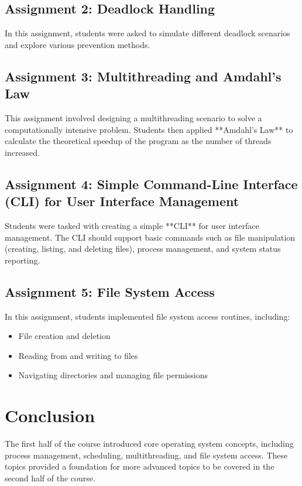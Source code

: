 \documentclass[12pt]{article}
\begin{document}
\subsection{Assignment 2: Deadlock Handling}
In this assignment, students were asked to simulate different deadlock scenarios and explore various prevention methods.

\subsection{Assignment 3: Multithreading and Amdahl's Law}
This assignment involved designing a multithreading scenario to solve a computationally intensive problem. Students then applied **Amdahl's Law** to calculate the theoretical speedup of the program as the number of threads increased.

\subsection{Assignment 4: Simple Command-Line Interface (CLI) for User Interface Management}
Students were tasked with creating a simple **CLI** for user interface management. The CLI should support basic commands such as file manipulation (creating, listing, and deleting files), process management, and system status reporting.

\subsection{Assignment 5: File System Access}
In this assignment, students implemented file system access routines, including:
\begin{itemize}
    \item File creation and deletion
    \item Reading from and writing to files
    \item Navigating directories and managing file permissions
\end{itemize}

\section{Conclusion}
The first half of the course introduced core operating system concepts, including process management, scheduling, multithreading, and file system access. These topics provided a foundation for more advanced topics to be covered in the second half of the course.
\end{document}
